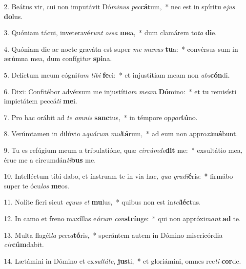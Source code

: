 2. Beátus vir, cui non imputávit Dó\textit{mi}\textit{nus} \textit{pec}\textbf{cá}tum,~*  nec est in spíritu e\textit{jus} \textbf{do}lus.\

3. Quóniam tácui, inveteravé\textit{runt} \textit{os}\textit{sa} \textbf{me}a,~*  dum clamárem to\textit{ta} \textbf{di}e.\

4. Quóniam die ac nocte graváta est super \textit{me} \textit{ma}\textit{nus} \textbf{tu}a:~*  convérsus sum in ærúmna mea, dum confígi\textit{tur} \textbf{spi}na.\

5. Delíctum meum cógni\textit{tum} \textit{ti}\textit{bi} \textbf{fe}ci:~*  et injustítiam meam non \textit{abs}\textbf{cón}di.\

6. Dixi: Confitébor advérsum me injustíti\textit{am} \textit{me}\textit{am} \textbf{Dó}mino:~*  et tu remisísti impietátem peccá\textit{ti} \textbf{me}i.\

7. Pro hac orábit ad \textit{te} \textit{om}\textit{nis} \textbf{sanc}tus,~*  in témpore op\textit{por}\textbf{tú}no.\

8. Verúmtamen in dilúvio a\textit{quá}\textit{rum} \textit{mul}\textbf{tá}rum,~*  ad eum non appro\textit{xi}\textbf{má}bunt.\

9. Tu es refúgium meum a tribulatióne, quæ \textit{cir}\textit{cúm}\textit{de}\textbf{dit} me:~*  exsultátio mea, érue me a circumdán\textit{ti}\textbf{bus} me.\

10. Intelléctum tibi dabo, et ínstruam te in via hac, \textit{qua} \textit{gra}\textit{di}\textbf{é}ris:~*  firmábo super te ócu\textit{los} \textbf{me}os.\

11. Nolíte fíeri sicut \textit{e}\textit{quus} \textit{et} \textbf{mu}lus,~*  quibus non est in\textit{tel}\textbf{léc}tus.\

12. In camo et freno maxíllas e\textit{ó}\textit{rum} \textit{con}\textbf{strín}ge:~*  qui non appróxi\textit{mant} \textbf{ad} te.\

13. Multa flagél\textit{la} \textit{pec}\textit{ca}\textbf{tó}ris,~*  sperántem autem in Dómino misericórdia \textit{cir}\textbf{cúm}dabit.\

14. Lætámini in Dómino et ex\textit{sul}\textit{tá}\textit{te}, \textbf{jus}ti,~*  et gloriámini, omnes rec\textit{ti} \textbf{cor}de.\

